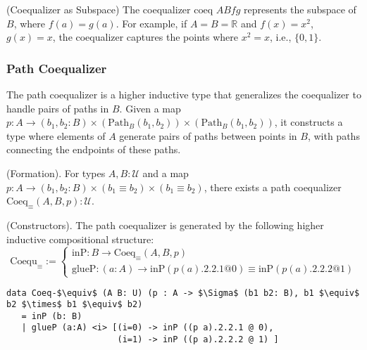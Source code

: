 \documentclass{article}
\begin{document}
\begin{example} (Coequalizer as Subspace)
The coequalizer \( \text{coeq } A B f g \) represents the subspace
of \( B \), where \( f(a) = g(a) \). For example, if \( A = B = \mathbb{R} \)
and \( f(x) = x^2 \), \( g(x) = x \), the coequalizer captures the points
where \( x^2 = x \), i.e., \( \{0, 1\} \).
\end{example}

\newpage
\subsubsection*{Path Coequalizer}
The path coequalizer is a higher inductive type that generalizes
the coequalizer to handle pairs of paths in \( B \). Given
a map \( p : A \to (b_1, b_2 : B) \times (\text{Path}_B (b_1, b_2)) \times (\text{Path}_B (b_1, b_2)) \),
it constructs a type where elements of \( A \) generate pairs
of paths between points in \( B \), with paths connecting
the endpoints of these paths.

\begin{definition} (Formation).
For types \( A, B : \mathcal{U} \) and a map \( p : A \to (b_1, b_2 : B) \times (b_1 \equiv b_2) \times (b_1 \equiv b_2) \),
there exists a path coequalizer \( \text{Coeq}_\equiv(A,B,p) : \mathcal{U} \).
\end{definition}

\begin{definition} (Constructors).
The path coequalizer is generated by the following higher inductive compositional structure:
\[
\text{Coequ}_\equiv :=
\begin{cases}
\text{inP} : B \to \text{Coeq}_\equiv(A,B,p) \\
\text{glueP} : (a : A) \to \text{inP}(p(a).2.2.1 @ 0) \equiv \text{inP}(p(a).2.2.2 @ 1)
\end{cases}
\]
\begin{lstlisting}[mathescape=true]
data Coeq-$\equiv$ (A B: U) (p : A -> $\Sigma$ (b1 b2: B), b1 $\equiv$ b2 $\times$ b1 $\equiv$ b2)
   = inP (b: B)
   | glueP (a:A) <i> [(i=0) -> inP ((p a).2.2.1 @ 0),
                      (i=1) -> inP ((p a).2.2.2 @ 1) ]
\end{lstlisting}
\end{definition}
\end{document}

